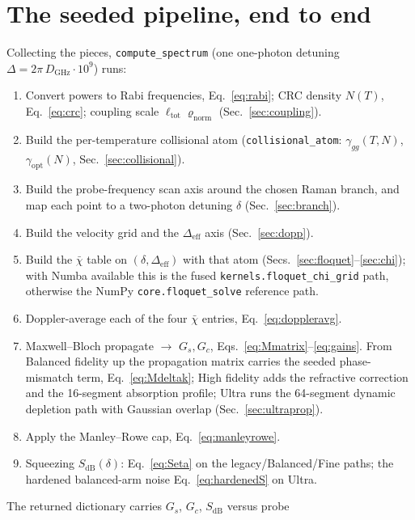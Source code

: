 \documentclass[11pt]{article}
\newcommand{\eff}{\mathrm{eff}}
\newcommand{\code}[1]{\texttt{#1}}
\newcommand{\rhobar}{\bar{\chi}}
\begin{document}
\section{The seeded pipeline, end to end}
\label{sec:pipeline}

Collecting the pieces, \code{compute\_spectrum} (one one-photon detuning
$\Delta=2\pi\,D_{\text{GHz}}\!\cdot\!10^9$) runs:
\begin{enumerate}[leftmargin=2.2em]
  \item Convert powers to Rabi frequencies, Eq.~\eqref{eq:rabi}; CRC density
  $N(T)$, Eq.~\eqref{eq:crc}; coupling scale
  $\ell_{\text{tot}}\varrho_{\text{norm}}$ (Sec.~\ref{sec:coupling}).
  \item Build the per-temperature collisional atom
  (\code{collisional\_atom}: $\gamma_{gg}(T,N)$, $\gamma_{\text{opt}}(N)$,
  Sec.~\ref{sec:collisional}).
  \item Build the probe-frequency scan axis around the chosen Raman branch, and map
  each point to a two-photon detuning $\delta$ (Sec.~\ref{sec:branch}).
  \item Build the velocity grid and the $\Delta_\eff$ axis (Sec.~\ref{sec:dopp}).
  \item Build the $\rhobar$ table on $(\delta,\Delta_\eff)$ with that atom
  (Secs.~\ref{sec:floquet}--\ref{sec:chi}); with Numba available this is the
  fused \code{kernels.floquet\_chi\_grid} path, otherwise the NumPy
  \code{core.floquet\_solve} reference path.
  \item Doppler-average each of the four $\rhobar$ entries,
  Eq.~\eqref{eq:doppleravg}.
  \item Maxwell--Bloch propagate $\to$ $G_s,G_c$,
  Eqs.~\eqref{eq:Mmatrix}--\eqref{eq:gains}. From Balanced fidelity up the
  propagation matrix carries the seeded phase-mismatch term,
  Eq.~\eqref{eq:Mdeltak}; High fidelity adds the refractive correction and the
  16-segment absorption profile; Ultra runs the 64-segment dynamic
  depletion path with Gaussian overlap (Sec.~\ref{sec:ultraprop}).
  \item Apply the Manley--Rowe cap, Eq.~\eqref{eq:manleyrowe}.
  \item Squeezing $S_{\text{dB}}(\delta)$: Eq.~\eqref{eq:Seta} on the
  legacy/Balanced/Fine paths; the hardened balanced-arm noise
  Eq.~\eqref{eq:hardenedS} on Ultra.
\end{enumerate}
The returned dictionary carries $G_s$, $G_c$, $S_{\text{dB}}$ versus probe
\end{document}
